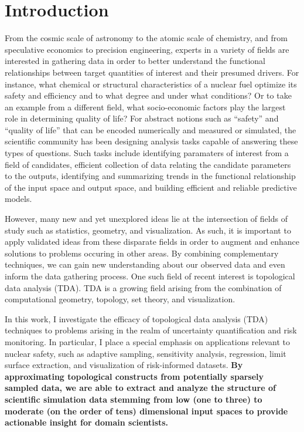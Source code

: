 
\chapter{Introduction}
\label{ch:introduction}
From the cosmic scale of astronomy to the atomic scale of chemistry, and from speculative economics to precision engineering, experts in a variety of fields are interested in gathering data in order to better understand the functional relationships between target quantities of interest and their presumed drivers.
%
For instance, what chemical or structural characteristics of a nuclear fuel optimize its safety and efficiency and to what degree and under what conditions?
%
Or to take an example from a different field, what socio-economic factors play the largest role in determining quality of life?
%
For abstract notions such as ``safety'' and ``quality of life'' that can be encoded numerically and measured or simulated, the scientific community has been designing analysis tasks capable of answering these types of questions.
%
Such tasks include identifying paramaters of interest from a field of candidates, efficient collection of data relating the candidate parameters to the outputs, identifying and summarizing trends in the functional relationship of the input space and output space, and building efficient and reliable predictive models.

However, many new and yet unexplored ideas lie at the intersection of fields of study such as statistics, geometry, and visualization.
%
As such, it is important to apply validated ideas from these disparate fields in order to augment and enhance solutions to problems occuring in other areas.
%
By combining complementary techniques, we can gain new understanding about our observed data and even inform the data gathering process.
%
One such field of recent interest is topological data analysis (TDA).
%
TDA is a growing field arising from the combination of computational geometry, topology, set theory, and visualization.

In this work, I investigate the efficacy of topological data analysis (TDA) techniques to problems arising in the realm of uncertainty quantification and risk monitoring.
%
In particular, I place a special emphasis on applications relevant to nuclear safety, such as adaptive sampling, sensitivity analysis, regression, limit surface extraction, and visualization of risk-informed datasets.
%
\textbf{By approximating topological constructs from potentially sparsely
sampled data, we are able to extract and analyze the structure of scientific simulation data stemming from low (one to three) to moderate (on the order of tens) dimensional input spaces to provide actionable insight for domain
scientists.}

